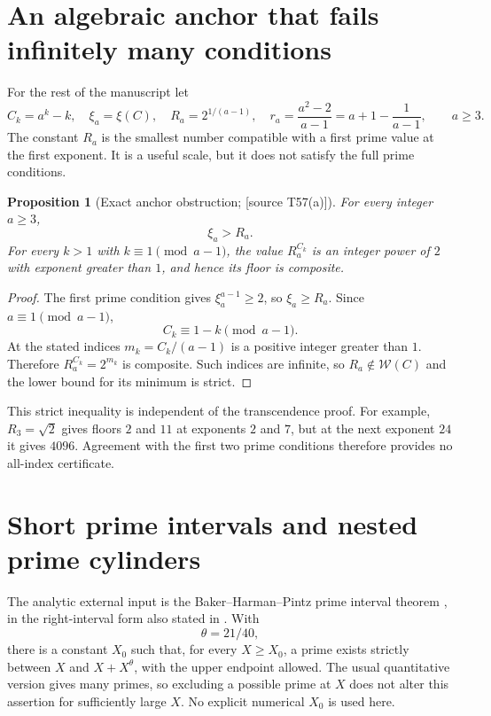 \documentclass[11pt,a4paper]{article}
\newtheorem{proposition}[theorem]{Proposition}
\theoremstyle{definition}\newtheorem{definition}[theorem]{Definition}
\theoremstyle{remark}\newtheorem{remark}[theorem]{Remark}
\newcommand{\sourceT}[1]{\textup{[source T#1]}}
\newcommand{\WW}{\mathcal W}
\begin{document}
\section{An algebraic anchor that fails infinitely many conditions}
For the rest of the manuscript let
\begin{equation}\label{eq:anchor}
 C_k=a^k-k,\quad \xi_a=\xi(C),\quad R_a=2^{1/(a-1)},
 \quad r_a=\frac{a^2-2}{a-1}=a+1-\frac1{a-1},
 \qquad a\ge3.
\end{equation}
The constant $R_a$ is the smallest number compatible with a first
prime value at the first exponent. It is a useful scale, but it does
not satisfy the full prime conditions.

\begin{proposition}[Exact anchor obstruction; \sourceT{57(a)}]
\label{prop:anchor}
For every integer $a\ge3$,
\[
 \xi_a>R_a.
\]
For every $k>1$ with $k\equiv1\pmod{a-1}$, the value
$R_a^{C_k}$ is an integer power of $2$ with exponent greater than $1$,
and hence its floor is composite.
\end{proposition}
\begin{proof}
The first prime condition gives
$\xi_a^{a-1}\ge2$, so $\xi_a\ge R_a$. Since
$a\equiv1\pmod{a-1}$,
\[
 C_k\equiv1-k\pmod{a-1}.
\]
At the stated indices $m_k=C_k/(a-1)$ is a positive integer greater
than $1$. Therefore
$R_a^{C_k}=2^{m_k}$ is composite. Such indices are infinite, so
$R_a\notin\WW(C)$ and the lower bound for its minimum is strict.
\end{proof}

This strict inequality is independent of the transcendence proof.
For example, $R_3=\sqrt2$ gives floors $2$ and $11$ at exponents
$2$ and $7$, but at the next exponent $24$ it gives $4096$. Agreement
with the first two prime conditions therefore provides no all-index
certificate.

\section{Short prime intervals and nested prime cylinders}
The analytic external input is the Baker--Harman--Pintz prime interval
theorem \cite{BHP}, in the right-interval form also stated in
\cite[Theorem~1.6]{SaitoVariants}. With
\[
 \theta=21/40,
\]
there is a constant $X_0$ such that, for every $X\ge X_0$, a prime
exists strictly between $X$ and $X+X^\theta$, with the upper endpoint
allowed. The usual quantitative version gives many primes, so
excluding a possible prime at $X$ does not alter this assertion for
sufficiently large $X$. No explicit numerical $X_0$ is used here.
\end{document}

